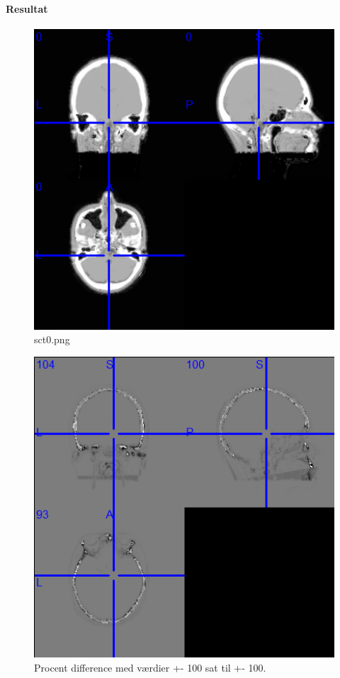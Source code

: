 \paragraph{Resultat}

\begin{figure}
\includegraphics[width=\linewidth]{sct0.png}
\caption{sct0.png}
\end{figure}

\begin{figure}
\includegraphics[width=\linewidth]{pdsct0.png}
\caption{Procent difference med værdier +- 100 sat til +- 100.}
\end{figure}

